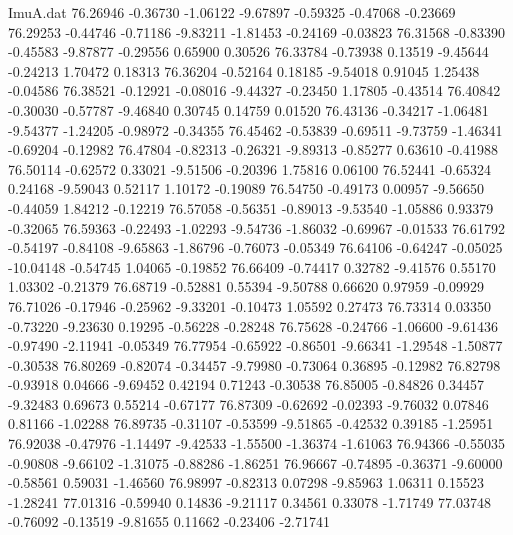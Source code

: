 \begin{filecontents}{ImuA.dat}
  76.26946   -0.36730   -1.06122   -9.67897   -0.59325   -0.47068   -0.23669
  76.29253   -0.44746   -0.71186   -9.83211   -1.81453   -0.24169   -0.03823
  76.31568   -0.83390   -0.45583   -9.87877   -0.29556    0.65900    0.30526
  76.33784   -0.73938    0.13519   -9.45644   -0.24213    1.70472    0.18313
  76.36204   -0.52164    0.18185   -9.54018    0.91045    1.25438   -0.04586
  76.38521   -0.12921   -0.08016   -9.44327   -0.23450    1.17805   -0.43514
  76.40842   -0.30030   -0.57787   -9.46840    0.30745    0.14759    0.01520
  76.43136   -0.34217   -1.06481   -9.54377   -1.24205   -0.98972   -0.34355
  76.45462   -0.53839   -0.69511   -9.73759   -1.46341   -0.69204   -0.12982
  76.47804   -0.82313   -0.26321   -9.89313   -0.85277    0.63610   -0.41988
  76.50114   -0.62572    0.33021   -9.51506   -0.20396    1.75816    0.06100
  76.52441   -0.65324    0.24168   -9.59043    0.52117    1.10172   -0.19089
  76.54750   -0.49173    0.00957   -9.56650   -0.44059    1.84212   -0.12219
  76.57058   -0.56351   -0.89013   -9.53540   -1.05886    0.93379   -0.32065
  76.59363   -0.22493   -1.02293   -9.54736   -1.86032   -0.69967   -0.01533
  76.61792   -0.54197   -0.84108   -9.65863   -1.86796   -0.76073   -0.05349
  76.64106   -0.64247   -0.05025  -10.04148   -0.54745    1.04065   -0.19852
  76.66409   -0.74417    0.32782   -9.41576    0.55170    1.03302   -0.21379
  76.68719   -0.52881    0.55394   -9.50788    0.66620    0.97959   -0.09929
  76.71026   -0.17946   -0.25962   -9.33201   -0.10473    1.05592    0.27473
  76.73314    0.03350   -0.73220   -9.23630    0.19295   -0.56228   -0.28248
  76.75628   -0.24766   -1.06600   -9.61436   -0.97490   -2.11941   -0.05349
  76.77954   -0.65922   -0.86501   -9.66341   -1.29548   -1.50877   -0.30538
  76.80269   -0.82074   -0.34457   -9.79980   -0.73064    0.36895   -0.12982
  76.82798   -0.93918    0.04666   -9.69452    0.42194    0.71243   -0.30538
  76.85005   -0.84826    0.34457   -9.32483    0.69673    0.55214   -0.67177
  76.87309   -0.62692   -0.02393   -9.76032    0.07846    0.81166   -1.02288
  76.89735   -0.31107   -0.53599   -9.51865   -0.42532    0.39185   -1.25951
  76.92038   -0.47976   -1.14497   -9.42533   -1.55500   -1.36374   -1.61063
  76.94366   -0.55035   -0.90808   -9.66102   -1.31075   -0.88286   -1.86251
  76.96667   -0.74895   -0.36371   -9.60000   -0.58561    0.59031   -1.46560
  76.98997   -0.82313    0.07298   -9.85963    1.06311    0.15523   -1.28241
  77.01316   -0.59940    0.14836   -9.21117    0.34561    0.33078   -1.71749
  77.03748   -0.76092   -0.13519   -9.81655    0.11662   -0.23406   -2.71741

\end{filecontents}
